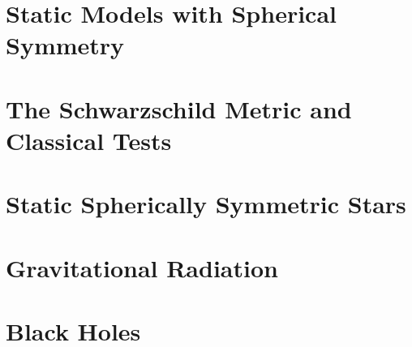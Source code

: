 \documentclass{momento}
\begin{document}
\chapter{Static Models with Spherical Symmetry}
\label{cha:static-models-with}


\chapter{The Schwarzschild Metric and Classical Tests}
\label{cha:schw-metr-class}


\chapter{Static Spherically Symmetric Stars}
\label{cha:einst-equat-stat}


\chapter{Gravitational Radiation}
\label{cha:grav-radi}



\chapter{Black Holes}
\label{cha:black-holes}





\appendices
\end{document}
